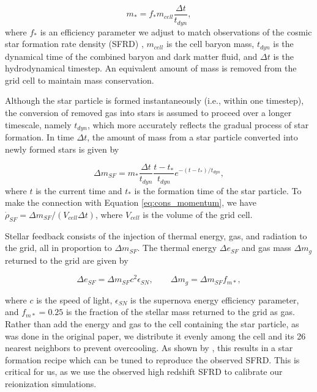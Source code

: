 \begin{equation}
m_* = f_* m_{cell} \frac{\Delta t}{t_{dyn}},
\end{equation}
where $f_*$ is an efficiency parameter we adjust to match observations of the cosmic star formation rate density (SFRD) \citep{BouwensEtAl2011}, $m_{cell}$ is the cell baryon mass, $t_{dyn}$ is the dynamical time of the combined baryon and dark matter fluid, and $\Delta t$ is the hydrodynamical timestep. An equivalent amount of mass is removed from the grid cell to maintain mass conservation. 

Although the star particle is formed instantaneously (i.e., within one timestep), the conversion of removed gas into stars is assumed to proceed over a longer timescale, namely $t_{dyn}$, which more accurately reflects the gradual process of star formation. In time $\Delta t$, the amount 
of mass from a star particle converted into newly formed stars is given by

\begin{equation}
\Delta m_{SF} = m_* \frac{\Delta t}{t_{dyn}} \frac{t-t_*}{t_{dyn}} e^{-(t-t_*)/t_{dyn}},
\end{equation}
where $t$ is the current time and $t_*$ is the formation time of the star particle. To make the 
connection with Equation \eqref{eq:cons_momentum}, we have $\dot{\rho}_{SF} =\Delta m_{SF}/(V_{cell}\Delta t)$, 
where $V_{cell}$ is the volume of the grid cell. 

Stellar feedback consists of the injection of thermal energy, gas, and radiation
to the grid, all in proportion to $\Delta m_{SF}$. The thermal energy $\Delta e_{SF}$ and gas
mass $\Delta m_g$ returned to the grid are given by

\begin{equation}
  \Delta e_{SF} = \Delta m_{SF} c^2 \epsilon_{SN}, \qquad
  \Delta m_g = \Delta m_{SF} f_{m*}, 
\end{equation}

where $c$ is the speed of light, $\epsilon_{SN}$ is the supernova energy efficiency parameter, and $f_{m*}=0.25$ is the fraction of the stellar mass returned to the grid as gas. Rather than add
the energy and gas to the cell containing the star particle, as was done in
the original \cite{CenOstriker1992} paper, we distribute it evenly among the cell and its
26 nearest neighbors to prevent overcooling. As shown by \cite{SmithEtAl2011}, this 
results in a star formation recipe which can be tuned to reproduce the observed SFRD. This is critical for us, as we use the observed high redshift SFRD to calibrate our reionization simulations. 

